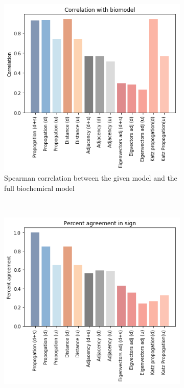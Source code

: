 \documentclass{article}
\begin{document}
\begin{figure}
    \centering
    \begin{subfigure}[b]{0.45\textwidth}
        \includegraphics[width=\textwidth]{Images/Correlation_unsigned_biomodel.png}
        \caption{Spearman correlation between the given model and the full biochemical model}
        \label{fig:unsigned_correlation_biomodel}
    \end{subfigure}
    ~ %
    \begin{subfigure}[b]{0.45\textwidth}
        \includegraphics[width=\textwidth]{Images/Percent_agreement_direction.png}

\end{subfigure}
\end{figure}
\end{document}
